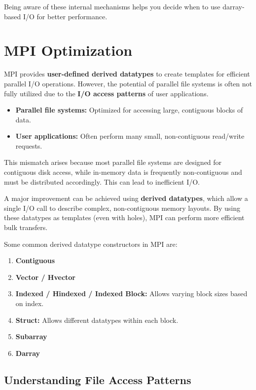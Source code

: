 \documentclass[12pt]{book}
\begin{document}
Being aware of these internal mechanisms helps you decide when to use darray-based I/O for better performance.


\section{MPI Optimization}
\label{sec:mpi_optimization}

MPI provides \textbf{user-defined derived datatypes} to create templates for efficient parallel I/O operations. However, the potential of parallel file systems is often not fully utilized due to the \textbf{I/O access patterns} of user applications.

\begin{itemize}
    \item \textbf{Parallel file systems:} Optimized for accessing large, contiguous blocks of data.
    \item \textbf{User applications:} Often perform many small, non-contiguous read/write requests.
\end{itemize}

This mismatch arises because most parallel file systems are designed for contiguous disk access, while in-memory data is frequently non-contiguous and must be distributed accordingly. This can lead to inefficient I/O.

A major improvement can be achieved using \textbf{derived datatypes}, which allow a single I/O call to describe complex, non-contiguous memory layouts. By using these datatypes as templates (even with holes), MPI can perform more efficient bulk transfers.

Some common derived datatype constructors in MPI are:
\begin{enumerate}
    \item \textbf{Contiguous}
    \item \textbf{Vector / Hvector}
    \item \textbf{Indexed / Hindexed / Indexed Block:} Allows varying block sizes based on index.
    \item \textbf{Struct:} Allows different datatypes within each block.
    \item \textbf{Subarray}
    \item \textbf{Darray}
\end{enumerate}

\subsection*{Understanding File Access Patterns}
\end{document}
